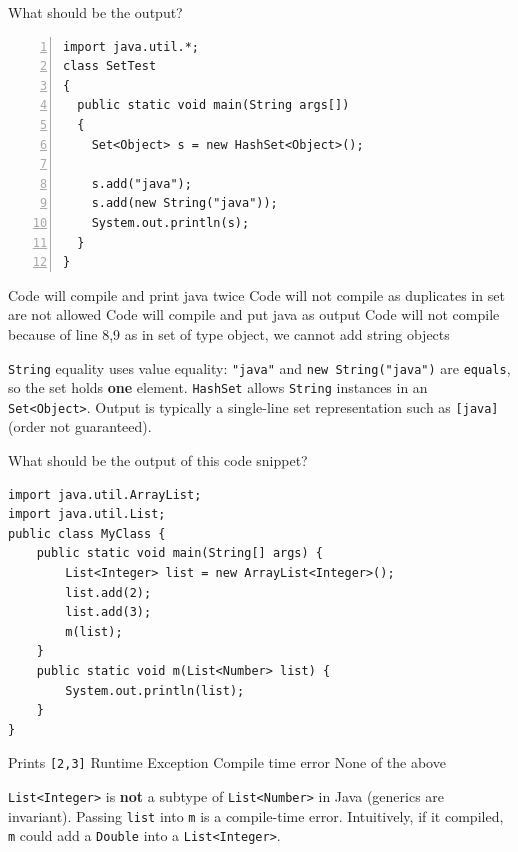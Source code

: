\question[4]
What should be the output?
\begin{lstlisting}[style=java,numbers=left]
import java.util.*;
class SetTest
{
  public static void main(String args[])
  {
    Set<Object> s = new HashSet<Object>();

    s.add("java");
    s.add(new String("java"));
    System.out.println(s);
  }
}
\end{lstlisting}
\begin{choices}
  \choice Code will compile and print java twice
  \choice Code will not compile as duplicates in set are not allowed
  \CorrectChoice Code will compile and put java as output
  \choice Code will not compile because of line 8,9 as in set of type object, we cannot add string objects
\end{choices}
\begin{solution}
  \texttt{String} equality uses value equality: \texttt{"java"} and \texttt{new String("java")} are \texttt{equals}, so the set holds \textbf{one} element. \texttt{HashSet} allows \texttt{String} instances in an \texttt{Set<Object>}. Output is typically a single-line set representation such as \texttt{[java]} (order not guaranteed).
\end{solution}


\newpage

\question[4]
What should be the output of this code snippet?
\begin{lstlisting}[style=java]
import java.util.ArrayList;
import java.util.List;
public class MyClass {
    public static void main(String[] args) {
        List<Integer> list = new ArrayList<Integer>();
        list.add(2);
        list.add(3);
        m(list);
    }
    public static void m(List<Number> list) {
        System.out.println(list);
    }
}
\end{lstlisting}
\begin{choices}
  \choice Prints \texttt{[2,3]}
  \choice Runtime Exception
  \CorrectChoice Compile time error
  \choice None of the above
\end{choices}
\begin{solution}
  \texttt{List<Integer>} is \textbf{not} a subtype of \texttt{List<Number>} in Java (generics are invariant). Passing \texttt{list} into \texttt{m} is a compile-time error. Intuitively, if it compiled, \texttt{m} could add a \texttt{Double} into a \texttt{List<Integer>}.
\end{solution}

